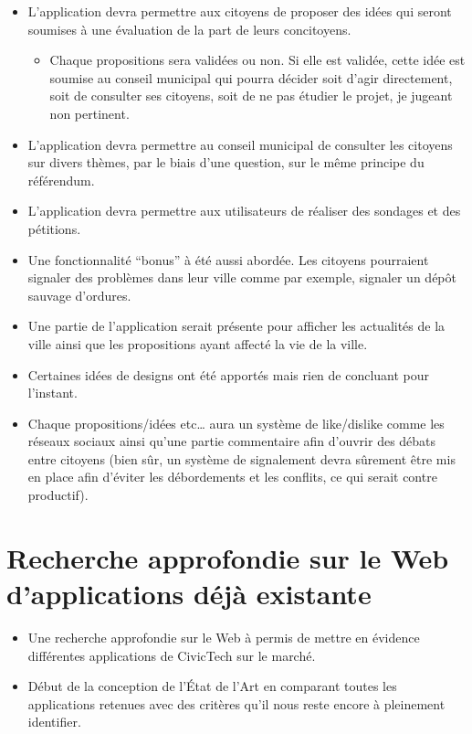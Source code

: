 \documentclass{article}
\begin{document}
\begin{itemize}

    \item \Large L’application devra permettre aux citoyens de proposer des idées qui seront soumises à une évaluation de la part de leurs concitoyens.
    
    \begin{itemize}
        \item \Large Chaque propositions sera validées ou non. Si elle est validée, cette idée est soumise au conseil municipal qui pourra décider soit d’agir directement, soit de consulter ses citoyens, soit de ne pas étudier le projet, je jugeant non pertinent.
    \end{itemize} 
    
    \item \Large L’application devra permettre au conseil municipal de consulter les citoyens sur divers thèmes, par le biais d’une question, sur le même principe du référendum.
    
    \item \Large L’application devra permettre aux utilisateurs de réaliser des sondages et des pétitions.

    \item Une fonctionnalité “bonus” à été aussi abordée. Les citoyens pourraient signaler des problèmes dans leur ville comme par exemple, signaler un dépôt sauvage d’ordures.
    
    \item \Large Une partie de l’application serait présente pour afficher les actualités de la ville ainsi que les propositions ayant affecté la vie de la ville.
    
    \item \Large Certaines idées de designs ont été apportés mais rien de concluant pour l’instant.
    
    \item \Large Chaque propositions/idées etc… aura un système de like/dislike comme les réseaux sociaux ainsi qu’une partie commentaire afin d’ouvrir des débats entre citoyens (bien sûr, un système de signalement devra sûrement être mis en place afin d’éviter les débordements et les conflits, ce qui serait contre productif). 
\end{itemize}

\section{\huge Recherche approfondie sur le Web d'applications déjà existante}

\begin{itemize}
\item \Large Une recherche approfondie sur le Web à permis de mettre en évidence différentes applications de CivicTech sur le marché.

\item \Large Début de la conception de l'État de l’Art  en comparant toutes les applications retenues avec des critères qu’il nous reste encore à pleinement identifier.
\end{itemize}
\end{document}
